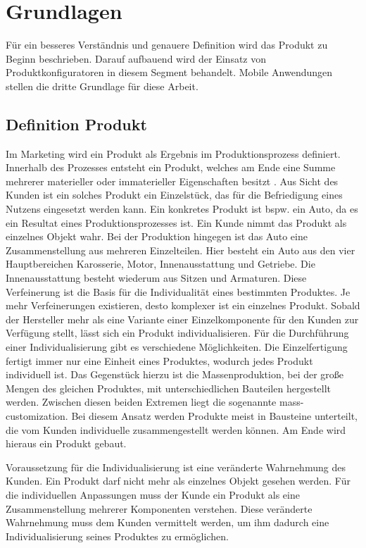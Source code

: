 \chapter{Grundlagen} \label{chapter_2}
Für ein besseres Verständnis und genauere Definition wird das Produkt zu Beginn beschrieben. Darauf aufbauend wird der Einsatz von Produktkonfiguratoren in diesem Segment behandelt. Mobile Anwendungen stellen die dritte Grundlage für diese Arbeit.

\section{Definition Produkt}
Im Marketing wird ein Produkt als Ergebnis im Produktionsprozess definiert. Innerhalb des Prozesses entsteht ein Produkt, welches am Ende eine Summe mehrerer materieller oder immaterieller Eigenschaften besitzt \cite{bib:product}. Aus Sicht des Kunden ist ein solches Produkt ein Einzelstück, das für die Befriedigung eines Nutzens eingesetzt werden kann. Ein konkretes Produkt ist bspw. ein Auto, da es ein Resultat eines Produktionsprozesses ist. Ein Kunde nimmt das Produkt als einzelnes Objekt wahr. Bei der Produktion hingegen ist das Auto eine Zusammenstellung aus mehreren Einzelteilen. Hier besteht ein Auto aus den vier Hauptbereichen Karosserie, Motor, Innenausstattung und Getriebe. Die Innenausstattung besteht wiederum aus Sitzen und Armaturen. Diese Verfeinerung ist die Basis für die Individualität eines bestimmten Produktes. Je mehr Verfeinerungen existieren, desto komplexer ist ein einzelnes Produkt. Sobald der Hersteller mehr als eine Variante einer Einzelkomponente für den Kunden zur Verfügung stellt, lässt sich ein Produkt individualisieren. Für die Durchführung einer Individualisierung gibt es verschiedene Möglichkeiten. Die Einzelfertigung fertigt immer nur eine Einheit eines Produktes, wodurch jedes Produkt individuell ist. Das Gegenstück hierzu ist die Massenproduktion, bei der große Mengen des gleichen Produktes, mit unterschiedlichen Bauteilen hergestellt werden. Zwischen diesen beiden Extremen liegt die sogenannte mass-customization. Bei diesem Ansatz werden Produkte meist in Bausteine unterteilt, die vom Kunden individuelle zusammengestellt werden können. Am Ende wird hieraus ein Produkt gebaut.
 \par 

Voraussetzung für die Individualisierung ist eine veränderte Wahrnehmung des Kunden. Ein Produkt darf nicht mehr als einzelnes Objekt gesehen werden. Für die individuellen Anpassungen muss der Kunde ein Produkt als eine Zusammenstellung mehrerer Komponenten verstehen. Diese veränderte Wahrnehmung muss dem Kunden vermittelt werden, um ihm dadurch eine Individualisierung seines Produktes zu ermöglichen. \par

